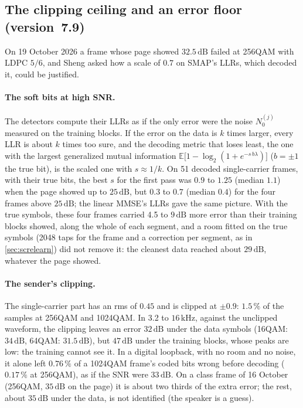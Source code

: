 \documentclass[11pt,a4paper]{article}
\newcommand{\kHz}{\,\mathrm{kHz}}
\newcommand{\dB}{\,\mathrm{dB}}
\theoremstyle{remark}
\begin{document}
\subsection{The clipping ceiling and an error floor (version~7.9)}
\label{sec:scfloor}
On 19 October 2026 a frame whose page showed $32.5\dB$ failed at 256QAM with LDPC $5/6$, and Sheng asked how a scale of $0.7$ on SMAP's LLRs, which decoded it, could be justified.

\paragraph{The soft bits at high SNR.} The detectors compute their LLRs as if the only error were the noise $N_0^{(j)}$ measured on the training blocks. If the error on the data is $k$ times larger, every LLR is about $k$ times too sure, and the decoding metric that loses least, the one with the largest generalized mutual information $\mathbb E\bigl[1 - \log_2(1 + e^{-s\,b\lambda})\bigr]$ ($b = \pm 1$ the true bit), is the scaled one with $s \approx 1/k$. On 51 decoded single-carrier frames, with their true bits, the best $s$ for the first pass was $0.9$ to $1.25$ (median $1.1$) when the page showed up to $25\dB$, but $0.3$ to $0.7$ (median $0.4$) for the four frames above $25\dB$; the linear MMSE's LLRs gave the same picture. With the true symbols, these four frames carried 4.5 to $9\dB$ more error than their training blocks showed, along the whole of each segment, and a room fitted on the true symbols (2048 taps for the frame and a correction per segment, as in \cref{sec:screlearn}) did not remove it: the cleanest data reached about $29\dB$, whatever the page showed.

\paragraph{The sender's clipping.} The single-carrier part has an rms of $0.45$ and is clipped at $\pm 0.9$: $1.5\,\%$ of the samples at 256QAM and 1024QAM. In 3.2 to $16\kHz$, against the unclipped waveform, the clipping leaves an error $32\dB$ under the data symbols (16QAM: $34\dB$, 64QAM: $31.5\dB$), but $47\dB$ under the training blocks, whose peaks are low: the training cannot see it. In a digital loopback, with no room and no noise, it alone left $0.76\,\%$ of a 1024QAM frame's coded bits wrong before decoding ($0.17\,\%$ at 256QAM), as if the SNR were $33\dB$. On a class frame of 16 October (256QAM, $35\dB$ on the page) it is about two thirds of the extra error; the rest, about $35\dB$ under the data, is not identified (the speaker is a guess).
\end{document}

